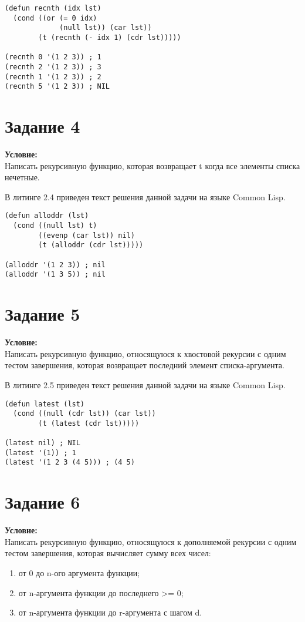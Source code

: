 \begin{lstlisting}[caption={Задание \No{}3}]
(defun recnth (idx lst)
  (cond ((or (= 0 idx)
             (null lst)) (car lst))
        (t (recnth (- idx 1) (cdr lst)))))

(recnth 0 '(1 2 3)) ; 1
(recnth 2 '(1 2 3)) ; 3
(recnth 1 '(1 2 3)) ; 2
(recnth 5 '(1 2 3)) ; NIL
\end{lstlisting}

\section{Задание \No{}4}
\textbf{Условие:}\\Написать рекурсивную функцию, которая возвращает t когда все элементы списка нечетные.

В литинге 2.4 приведен текст решения данной задачи на языке Common Lisp.

\begin{lstlisting}[caption={Задание \No{}4}]
(defun alloddr (lst)
  (cond ((null lst) t)
        ((evenp (car lst)) nil)
        (t (alloddr (cdr lst)))))

(alloddr '(1 2 3)) ; nil
(alloddr '(1 3 5)) ; nil
\end{lstlisting}

\section{Задание \No{}5}
\textbf{Условие:}\\Написать рекурсивную функцию, относящуюся к хвостовой рекурсии с одним тестом завершения, которая возвращает последний элемент списка-аргумента.

В литинге 2.5 приведен текст решения данной задачи на языке Common Lisp.

\begin{lstlisting}[caption={Задание \No{}5}]
(defun latest (lst)
  (cond ((null (cdr lst)) (car lst))
        (t (latest (cdr lst)))))

(latest nil) ; NIL
(latest '(1)) ; 1
(latest '(1 2 3 (4 5))) ; (4 5)
\end{lstlisting}

\section{Задание \No{}6}
\textbf{Условие:}\\Написать рекурсивную функцию, относящуюся к дополняемой рекурсии с одним тестом завершения, которая вычисляет сумму всех чисел:
\begin{enumerate}
    \item от 0 до n-ого аргумента функции;
    \item от n-аргумента функции до последнего >= 0;
    \item от n-аргумента функции до r-аргумента с шагом d.
\end{enumerate}


